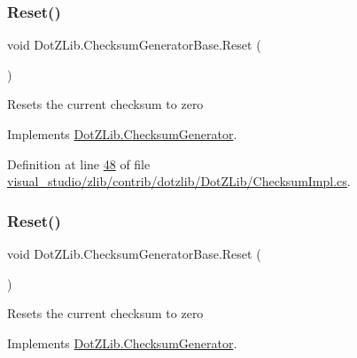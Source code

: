 \subsubsection{\texorpdfstring{Reset()}{Reset()}\hspace{0.1cm}{\footnotesize\ttfamily [1/2]}}
{\footnotesize\ttfamily void Dot\+Z\+Lib.\+Checksum\+Generator\+Base.\+Reset (\begin{DoxyParamCaption}{ }\end{DoxyParamCaption})\hspace{0.3cm}{\ttfamily [inline]}}



Resets the current checksum to zero 



Implements \hyperlink{interface_dot_z_lib_1_1_checksum_generator_ad01fdc9c4b4e5512dec8bc5072d97ffb}{Dot\+Z\+Lib.\+Checksum\+Generator}.



Definition at line \hyperlink{visual__studio_2zlib_2contrib_2dotzlib_2_dot_z_lib_2_checksum_impl_8cs_source_l00048}{48} of file \hyperlink{visual__studio_2zlib_2contrib_2dotzlib_2_dot_z_lib_2_checksum_impl_8cs_source}{visual\+\_\+studio/zlib/contrib/dotzlib/\+Dot\+Z\+Lib/\+Checksum\+Impl.\+cs}.

\mbox{\label{class_dot_z_lib_1_1_checksum_generator_base_a78ec9de09223c6f9f81e4a32d8d00b70}} 
\subsubsection{\texorpdfstring{Reset()}{Reset()}\hspace{0.1cm}{\footnotesize\ttfamily [2/2]}}
{\footnotesize\ttfamily void Dot\+Z\+Lib.\+Checksum\+Generator\+Base.\+Reset (\begin{DoxyParamCaption}{ }\end{DoxyParamCaption})\hspace{0.3cm}{\ttfamily [inline]}}



Resets the current checksum to zero 



Implements \hyperlink{interface_dot_z_lib_1_1_checksum_generator_ad01fdc9c4b4e5512dec8bc5072d97ffb}{Dot\+Z\+Lib.\+Checksum\+Generator}.



